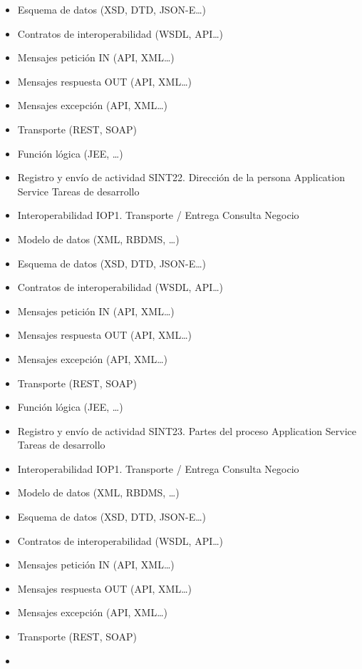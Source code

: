 \documentclass[
  paper=a4,
  ,captions=tableheading
]{scrartcl}
\begin{document}
\begin{itemize}
\item
  Esquema de datos (XSD, DTD, JSON-E\ldots)
\item
  Contratos de interoperabilidad (WSDL, API\ldots)
\item
  Mensajes petición IN (API, XML\ldots)
\item
  Mensajes respuesta OUT (API, XML\ldots)
\item
  Mensajes excepción (API, XML\ldots)
\item
  Transporte (REST, SOAP)
\item
  Función lógica (JEE, \ldots)
\item
  Registro y envío de actividad \textbar{} \textbar{} SINT22. Dirección
  de la persona \textbar{} Application Service \textbar{} Tareas de
  desarrollo
\item
  Interoperabilidad IOP1. Transporte / Entrega Consulta Negocio\\
\item
  Modelo de datos (XML, RBDMS, \ldots)
\item
  Esquema de datos (XSD, DTD, JSON-E\ldots)
\item
  Contratos de interoperabilidad (WSDL, API\ldots)
\item
  Mensajes petición IN (API, XML\ldots)
\item
  Mensajes respuesta OUT (API, XML\ldots)
\item
  Mensajes excepción (API, XML\ldots)
\item
  Transporte (REST, SOAP)
\item
  Función lógica (JEE, \ldots)
\item
  Registro y envío de actividad \textbar{} \textbar{} SINT23. Partes del
  proceso \textbar{} Application Service \textbar{} Tareas de desarrollo
\item
  Interoperabilidad IOP1. Transporte / Entrega Consulta Negocio\\
\item
  Modelo de datos (XML, RBDMS, \ldots)
\item
  Esquema de datos (XSD, DTD, JSON-E\ldots)
\item
  Contratos de interoperabilidad (WSDL, API\ldots)
\item
  Mensajes petición IN (API, XML\ldots)
\item
  Mensajes respuesta OUT (API, XML\ldots)
\item
  Mensajes excepción (API, XML\ldots)
\item
  Transporte (REST, SOAP)
\item

\end{itemize}
\end{document}
